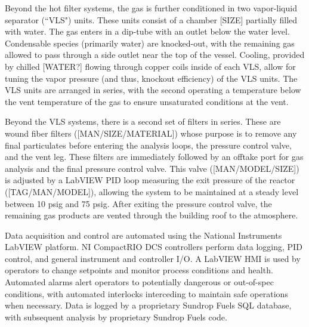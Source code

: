 \documentclass[11pt,twocolumn]{article}
\begin{document}
Beyond the hot filter systems, the gas is further conditioned in two vapor-liquid separator (``VLS") units.  These units consist of a chamber [SIZE] partially filled with water.  The gas enters in a dip-tube with an outlet below the water level.  Condensable species (primarily water) are knocked-out, with the remaining gas allowed to pass through a side outlet near the top of the vessel.  Cooling, provided by chilled [WATER?] flowing through copper coils inside of each VLS, allow for tuning the vapor pressure (and thus, knockout efficiency) of the VLS units.  The VLS units are arranged in series, with the second operating a temperature below the vent temperature of the gas to ensure unsaturated conditions at the vent.

Beyond the VLS systems, there is a second set of filters in series.  These are wound fiber filters ([MAN/SIZE/MATERIAL]) whose purpose is to remove any final particulates before entering the analysis loops, the pressure control valve, and the vent leg. These filters are immediately followed by an offtake port for gas analysis and the final pressure control valve.  This valve ([MAN/MODEL/SIZE]) is adjusted by a LabVIEW PID loop measuring the exit pressure of the reactor ([TAG/MAN/MODEL]), allowing the system to be maintained at a steady level between 10 psig and 75 psig.  After exiting the pressure control valve, the remaining gas products are vented through the building roof to the atmosphere.

Data acquisition and control are automated using the National Instruments LabVIEW platform.  NI CompactRIO DCS controllers perform data logging, PID control, and general instrument and controller I/O.  A LabVIEW HMI is used by operators to change setpoints and monitor process conditions and health.  Automated alarms alert operators to potentially dangerous or out-of-spec conditions, with automated interlocks interceding to maintain safe operations when necessary.  Data is logged by a proprietary Sundrop Fuels SQL database, with subsequent analysis by proprietary Sundrop Fuels code.
\end{document}

